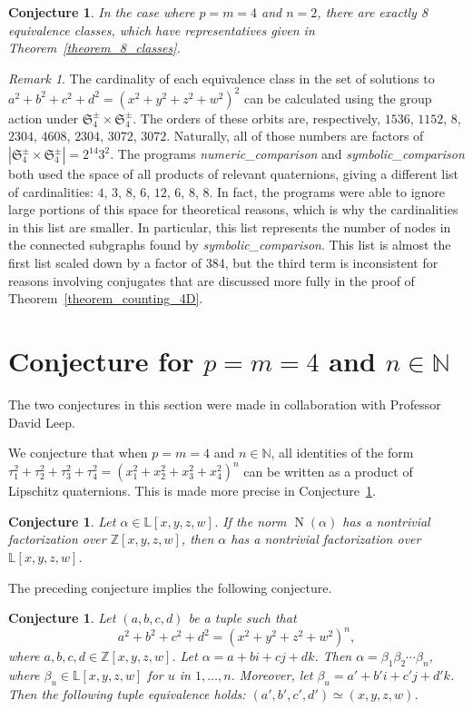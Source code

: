 \documentclass[12pt,table]{article}
\newtheorem{conjecture}[theorem]{Conjecture}
\theoremstyle{definition}
\theoremstyle{remark}
\newtheorem{remark}[theorem]{Remark}
\newcommand{\Nnn}{\mathbb N}
\newcommand{\Zzz}{\mathbb Z}
\newcommand{\Lll}{\mathbb L}
\numberwithin{equation}{section}
\DeclareMathOperator{\N}{N}
\begin{document}
\begin{conjecture}
In the case where  $p = m = 4$ and $n = 2$,
there are exactly 8 equivalence classes, which have representatives
given in Theorem~\ref{theorem_8_classes}.
\end{conjecture}

\begin{remark}
The cardinality of each equivalence class in the
set of solutions to $a^2 + b^2 + c^2 + d^2 = (x^2 + y^2 + z^2 + w^2)^2$
can be calculated using the group action under
$ \mathfrak{S}_4^\pm \times \mathfrak{S}_4^\pm $.
The orders of these orbits are, respectively,
$1536$, $1152$, $8$, $2304$, $4608$, $2304$, $3072$, $3072$.
Naturally, all of those numbers are factors of
$ | \mathfrak{S}_4^\pm \times \mathfrak{S}_4^\pm | = 2^{14} 3^2 $.
The programs \emph{numeric\_comparison} and \emph{symbolic\_comparison} 
both used the space of all products of relevant quaternions,
giving a different list of cardinalities:
$4$, $3$, $8$, $6$, $12$, $6$, $8$, $8$.
In fact, the programs were able to ignore large
portions of this space for theoretical reasons,
which is why the cardinalities in this list are
smaller.
In particular, this list represents the number of
nodes in the connected subgraphs found by  \emph{symbolic\_comparison}.
This list is almost the first list
scaled down by a factor of 384, but the third term is inconsistent
for reasons involving conjugates that are discussed more fully in
the proof of Theorem~\ref{theorem_counting_4D}.
\end{remark}

\section{Conjecture for $p = m = 4$ and $ n \in \Nnn $}
The two conjectures in this section were made in collaboration with
Professor David Leep.

We conjecture that when $p = m = 4$ and $ n \in \Nnn $,
all identities of the form
$
\tau_1 ^ 2  + \tau_2 ^ 2  + \tau_3 ^ 2  + \tau_4 ^ 2  
= 
\left(  x_1 ^ 2 + x_2 ^ 2 + x_3 ^ 2 + x_4 ^ 2
\right) ^ n 
$
can be written as
a product of Lipschitz quaternions.
This is made more precise in
Conjecture~\ref{conjecture_Ehrenborg-Leep}.

\begin{conjecture}
Let $ \alpha \in \Lll[x,y,z,w] $.
If the norm $ \N(\alpha) $ has a nontrivial
factorization over $ \Zzz[x,y,z,w] $,
then $ \alpha $ has a nontrivial
factorization over $ \Lll[x,y,z,w] $.
\end{conjecture}
The preceding conjecture implies the following conjecture.
\begin{conjecture}
\label{conjecture_Ehrenborg-Leep}
Let $ (a, b, c, d) $ be a tuple such that
\[
a^2 + b^2 + c^2 + d^2 = (x^2 + y^2 + z^2 + w^2)^n,
\] 
where $ a, b, c, d \in \Zzz[x,y,z,w]$.
Let $\alpha = a + bi + cj + dk $.
Then $ \alpha = \beta_1 \beta_2 \dotsm \beta_n $,
where $ \beta_u \in \Lll[x,y,z,w] $ for $u$ in $1, \dotsc, n$.
Moreover, let $ \beta_u = a' + b'i + c'j + d'k $. Then
the following tuple equivalence holds: $ (a', b', c', d') \simeq (x, y, z, w) $.
\end{conjecture}
\end{document}
